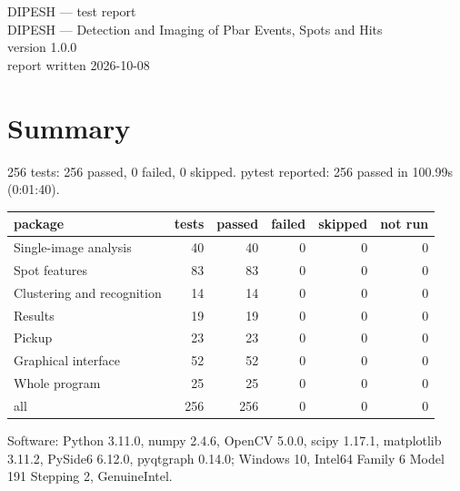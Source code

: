 \documentclass[10pt,a4paper]{article}
\begin{document}
\begin{center}
{\LARGE DIPESH --- test report}\\[6pt]
DIPESH --- Detection and Imaging of Pbar Events, Spots and Hits\\[4pt]
version 1.0.0\\
report written 2026-10-08
\end{center}

\section{Summary}
256 tests: 256 passed, 0 failed, 0 skipped. pytest reported: 256 passed in 100.99s (0:01:40).
\begin{center}
\begin{tabular}{lrrrrr}
\toprule
package & tests & passed & failed & skipped & not run \\
\midrule
Single-image analysis & 40 & 40 & 0 & 0 & 0 \\
Spot features & 83 & 83 & 0 & 0 & 0 \\
Clustering and recognition & 14 & 14 & 0 & 0 & 0 \\
Results & 19 & 19 & 0 & 0 & 0 \\
Pickup & 23 & 23 & 0 & 0 & 0 \\
Graphical interface & 52 & 52 & 0 & 0 & 0 \\
Whole program & 25 & 25 & 0 & 0 & 0 \\
\midrule
all & 256 & 256 & 0 & 0 & 0 \\
\bottomrule
\end{tabular}
\end{center}
Software: Python 3.11.0, numpy 2.4.6, OpenCV 5.0.0, scipy 1.17.1, matplotlib 3.11.2, PySide6 6.12.0, pyqtgraph 0.14.0; Windows 10, Intel64 Family 6 Model 191 Stepping 2, GenuineIntel.
\end{document}
